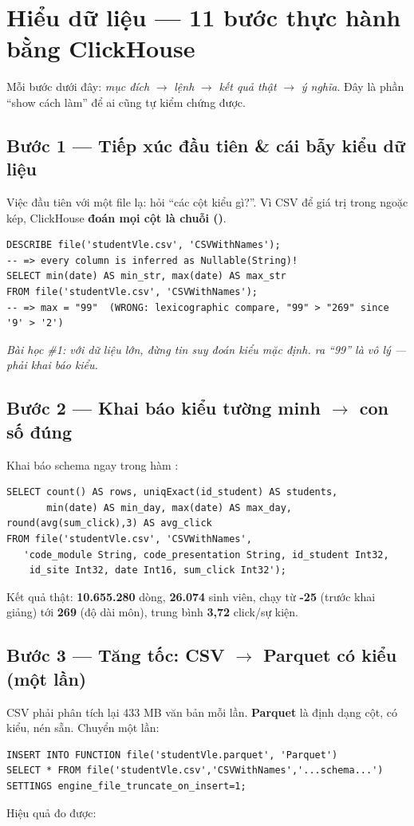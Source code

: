 \documentclass[11pt,a4paper]{article}
\newcommand{\code}[1]{\texttt{\detokenize{#1}}}
\newcommand{\takeaway}[1]{\par\smallskip{\color{themecol}$\Rightarrow$\,}\textit{#1}\par\smallskip}
\newcommand{\bignum}[1]{{\color{themecol}\textbf{#1}}}
\begin{document}
\section{Hiểu dữ liệu — 11 bước thực hành bằng ClickHouse}
Mỗi bước dưới đây: \textit{mục đích} $\to$ \textit{lệnh} $\to$ \textit{kết quả thật} $\to$
\textit{ý nghĩa}. Đây là phần ``show cách làm'' để ai cũng tự kiểm chứng được.

\subsection{Bước 1 — Tiếp xúc đầu tiên \& cái bẫy kiểu dữ liệu}
Việc đầu tiên với một file lạ: hỏi ``các cột kiểu gì?''. Vì CSV để giá trị trong ngoặc kép,
ClickHouse \textbf{đoán mọi cột là chuỗi (\code{String})}.
\begin{lstlisting}[language=ch]
DESCRIBE file('studentVle.csv', 'CSVWithNames');
-- => every column is inferred as Nullable(String)!
SELECT min(date) AS min_str, max(date) AS max_str
FROM file('studentVle.csv', 'CSVWithNames');
-- => max = "99"  (WRONG: lexicographic compare, "99" > "269" since '9' > '2')
\end{lstlisting}

\takeaway{Bài học \#1: với dữ liệu lớn, đừng tin suy đoán kiểu mặc định. \code{max(date)} ra ``99''
là vô lý — phải khai báo kiểu.}

\subsection{Bước 2 — Khai báo kiểu tường minh $\to$ con số đúng}
Khai báo schema ngay trong hàm \code{file()}:
\begin{lstlisting}[language=ch]
SELECT count() AS rows, uniqExact(id_student) AS students,
       min(date) AS min_day, max(date) AS max_day, round(avg(sum_click),3) AS avg_click
FROM file('studentVle.csv', 'CSVWithNames',
   'code_module String, code_presentation String, id_student Int32,
    id_site Int32, date Int16, sum_click Int32');
\end{lstlisting}
\noindent Kết quả thật: \bignum{10.655.280} dòng, \bignum{26.074} sinh viên, \code{date} chạy từ
\bignum{-25} (trước khai giảng) tới \bignum{269} (độ dài môn), trung bình \bignum{3,72} click/sự kiện.

\subsection{Bước 3 — Tăng tốc: CSV $\rightarrow$ Parquet có kiểu (một lần)}
CSV phải phân tích lại 433 MB văn bản mỗi lần. \textbf{Parquet} là định dạng cột, có kiểu, nén
sẵn. Chuyển một lần:
\begin{lstlisting}[language=ch]
INSERT INTO FUNCTION file('studentVle.parquet', 'Parquet')
SELECT * FROM file('studentVle.csv','CSVWithNames','...schema...')
SETTINGS engine_file_truncate_on_insert=1;
\end{lstlisting}
\noindent Hiệu quả đo được:
\end{document}
